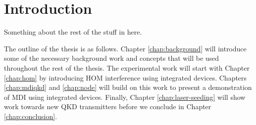 %
%
\graphicspath{{./chapters/chapter01/fig01/}}

\let\textcircled=\pgftextcircled
\chapter{Introduction}
\label{chap:intro}


Something about the rest of the stuff in here.

\lipsum[1-7]
\lipsum[1-7]

The outline of the thesis is as follows. Chapter \ref{chap:background} will introduce some of the necessary background work and concepts that will be used throughout the rest of the thesis. The experimental work will start with Chapter \ref{chap:hom} by introducing \ac{HOM} interference using integrated devices. Chapters \ref{chap:mdiqkd} and \ref{chap:node} will build on this work to present a demonstration of \ac{MDI} using integrated devices. Finally, Chapter \ref{chap:laser-seeding} will show work towards new \ac{QKD} transmitters before we conclude in Chapter \ref{chap:conclusion}.

